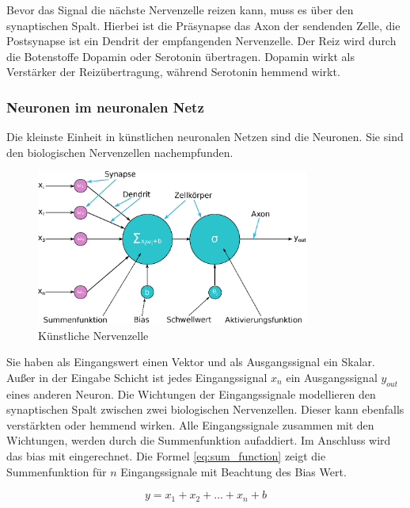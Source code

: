 Bevor das Signal die nächste Nervenzelle reizen kann, muss es über den synaptischen Spalt. Hierbei ist die Präsynapse das Axon der sendenden Zelle, die Postsynapse ist ein Dendrit der empfangenden Nervenzelle. Der Reiz wird durch die Botenstoffe Dopamin oder Serotonin übertragen. Dopamin wirkt als Verstärker der Reizübertragung, während Serotonin hemmend wirkt.

\subsubsection{Neuronen im neuronalen Netz}
Die kleinste Einheit in künstlichen neuronalen Netzen sind die Neuronen. Sie sind den biologischen Nervenzellen nachempfunden. \vspace{0.2cm}

\begin{figure}[!ht]
	\includegraphics[width=0.8\textwidth]{content/chapter_basics/images/artificial_neuron.eps}
	\centering
	\caption{Künstliche Nervenzelle}
	\label{img:artificial_neuron}
\end{figure}

Sie haben als Eingangswert einen Vektor und als Ausgangssignal ein Skalar. Außer in der Eingabe Schicht ist jedes Eingangssignal $x_n$ ein Ausgangssignal $y_{out}$ eines anderen Neuron. Die Wichtungen der Eingangssignale modellieren den synaptischen Spalt zwischen zwei biologischen Nervenzellen. Dieser kann ebenfalls verstärkten oder hemmend wirken. Alle Eingangssignale zusammen mit den Wichtungen, werden durch die Summenfunktion aufaddiert. Im Anschluss wird das \gls{bias} mit eingerechnet. Die Formel \ref{eq:sum_function} zeigt die Summenfunktion für $n$ Eingangssignale mit Beachtung des Bias Wert.

\begin{equation} \label{eq:sum_function}
	y = x_{1} + x_{2} + \dots + x_{n} + b
\end{equation}

